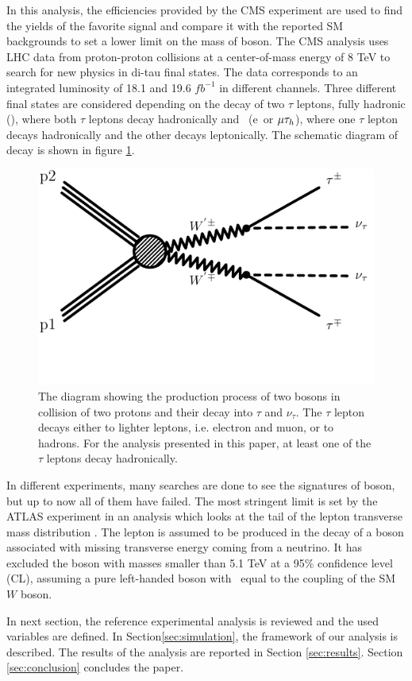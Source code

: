 In this analysis, the efficiencies provided by the CMS experiment \cite{Khachatryan:2016trj} are used to find the yields of the favorite signal and compare it with the reported SM backgrounds to set a lower limit on the mass of \wprime boson. 
The CMS analysis uses LHC data from proton-proton collisions at a center-of-mass energy of 8 TeV to search for new physics in di-tau final states.  The data corresponds to an integrated luminosity of 18.1 and 19.6 $fb^{-1}$ in different channels. Three different final states are considered depending on the decay of two $\tau$ leptons, fully hadronic (\tauTau), where both $\tau$ leptons decay hadronically and \lepTau  ~(e\Tau ~or $\mu\tau_h$), where one $\tau$ lepton decays hadronically and the other decays leptonically. The schematic diagram of decay is shown in figure \ref{fig:wprimefeyndiagram}.
\begin{figure}[!htb]
  \includegraphics*[width=.45\textwidth]{figs/WpWpTauTau.pdf}
  \caption{The diagram showing the production process of two \wprime bosons in collision of two protons and their decay into $\tau$ and $\nu_{\tau}$. The $\tau$ lepton decays either to lighter leptons, i.e. electron and muon, or to hadrons. For the analysis presented in this paper, at least one of the $\tau$ leptons decay hadronically.}
  \label{fig:wprimefeyndiagram}
\end{figure}

In different experiments, many searches are done to see the signatures of \wprime boson, but up to now all of them have failed. The most stringent limit is set by the ATLAS experiment in an analysis which looks at the tail of the lepton transverse mass distribution \cite{Aaboud:2017efa}. The lepton is assumed to be produced in the decay of a \wprime boson associated with missing transverse energy coming from a neutrino. It has excluded the \wprime boson with masses smaller than 5.1 TeV at a 95\% confidence level (CL), assuming a pure left-handed \wprime boson with \gL ~equal to the coupling of the SM $W$ boson. 


In next section, the reference experimental analysis is reviewed and the used variables are defined. In Section\ref{sec:simulation}, the framework of our analysis is described. The results of the analysis are reported in Section \ref{sec:results}. Section \ref{sec:conclusion} concludes the paper.